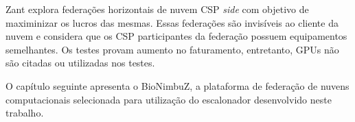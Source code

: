 Zant \cite{6814036} explora federações horizontais de nuvem \acrfull{CSP} \textit{side} com objetivo de maximinizar os lucros das mesmas. Essas federações são invisíveis ao cliente da nuvem e considera que os \acrshort{CSP} participantes da federação possuem equipamentos semelhantes. Os testes provam aumento no faturamento, entretanto, \acrshort{GPU}s não são citadas ou utilizadas nos testes.


O capítulo seguinte apresenta o BioNimbuZ, a plataforma de federação de nuvens computacionais selecionada para utilização do escalonador desenvolvido neste trabalho.

